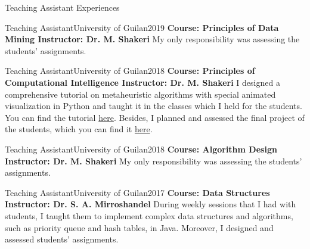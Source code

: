 \documentclass[]{mcdowellcv}
\begin{document}
	
    \begin{cvsection}{Teaching Assistant Experiences}
    
    	\begin{cvsubsection}{Teaching Assistant}{University of Guilan}{2019}
    	    \setlength{\columnsep}{-2.1in}
    	    \textbf{Course: Principles of Data Mining \newline Instructor: Dr. M. Shakeri} \newline
    	    My only responsibility was assessing the students' assignments.
    	\end{cvsubsection}
    	
    	\begin{cvsubsection}{Teaching Assistant}{University of Guilan}{2018}
    	    \setlength{\columnsep}{-2.1in}
    	    \textbf{Course: Principles of Computational Intelligence \newline Instructor: Dr. M. Shakeri} \newline
            I designed a comprehensive tutorial on metaheuristic algorithms with special animated visualization in Python and taught it in the classes which I held for the students. You can find the tutorial \href{https://github.com/Computational-Intelligence-Fall18/Computational-Intelligence-Tutorials}{here}. Besides, I planned and assessed the final project of the students, which you can find it \href{https://github.com/Computational-Intelligence-Fall18/Student-Classification-Assignment}{here}.
    	\end{cvsubsection}
    	
    	\begin{cvsubsection}{Teaching Assistant}{University of Guilan}{2018}
    	    \setlength{\columnsep}{-2.1in}
    	    \textbf{Course: Algorithm Design \newline Instructor: Dr. M. Shakeri} \newline
    	    My only responsibility was assessing the students' assignments.
    	\end{cvsubsection}
    	
    	\begin{cvsubsection}{Teaching Assistant}{University of Guilan}{2017}
    	    \setlength{\columnsep}{-2.1in}
    	    \textbf{Course: Data Structures \newline Instructor: Dr. S. A. Mirroshandel} \newline
        During weekly sessions that I had with students, I taught them to implement complex data structures and algorithms, such as priority queue and hash tables, in Java. Moreover, I designed and assessed students' assignments.


\end{cvsubsection}
\end{cvsection}
\end{document}

